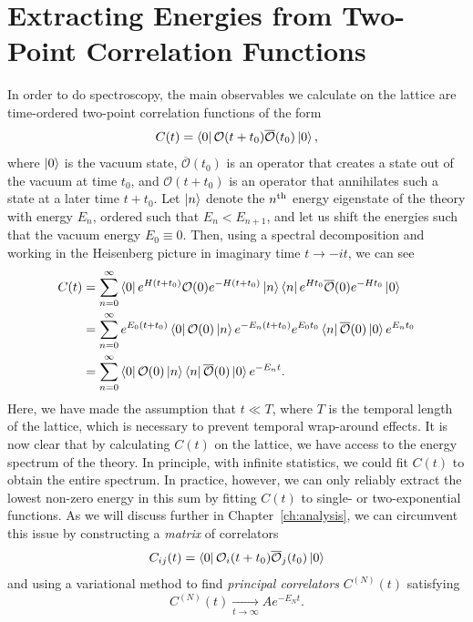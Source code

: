 \section{Extracting Energies from Two-Point Correlation Functions}\label{sec:intro_corr}
In order to do spectroscopy, the main observables we calculate on the lattice are time-ordered two-point correlation functions of the form
\begin{equation}
    C(t) = \bra 0 \mathcal O (t+t_0) \overline{\mathcal O}(t_0) \ket 0,
\end{equation}
where $\ket 0$ is the vacuum state, $\overline{\mathcal O}(t_0)$ is an operator that creates a state out of the vacuum at time $t_0$, and $\mathcal O (t+t_0)$ is an operator that annihilates such a state at a later time $t+t_0$. Let $\ket n$ denote the $n^{\rm{th}}$ energy eigenstate of the theory with energy $E_n$, ordered such that $E_n < E_{n+1}$, and let us shift the energies such that the vacuum energy $E_0 \equiv 0$. Then, using a spectral decomposition and working in the Heisenberg picture in imaginary time $t\rightarrow -it$, we can see
\begin{equation}\label{eq:corr_decomp}
    \begin{aligned}
        C(t) &= \sum_{n=0}^\infty \bra 0 e^{H(t+t_0)} \mathcal O(0) e^{-H(t+t_0)} \ket n \bra n e^{H t_0} \overline{\mathcal O}(0)e^{-H t_0} \ket 0 \\
        &=\sum_{n=0}^\infty e^{E_0(t+t_0)} \bra 0 \mathcal O(0) \ket n e^{-E_n(t+t_0)} e^{E_0 t_0} \bra n \overline{\mathcal O}(0) \ket 0 e^{E_n t_0}\\
        & = \sum_{n=0}^\infty \bra 0 \mathcal O(0) \ket n \bra n \overline{\mathcal O}(0)\ket 0 e^{-E_n t}.
    \end{aligned}
\end{equation}
Here, we have made the assumption that $t \ll T$, where $T$ is the temporal length of the lattice, which is necessary to prevent temporal wrap-around effects. It is now clear that by calculating $C(t)$ on the lattice, we have access to the energy spectrum of the theory. In principle, with infinite statistics, we could fit $C(t)$ to obtain the entire spectrum. In practice, however, we can only reliably extract the lowest non-zero energy in this sum by fitting $C(t)$ to single- or two-exponential functions. As we will discuss further in Chapter~\ref{ch:analysis}, we can circumvent this issue by constructing a \emph{matrix} of correlators
\begin{equation}
    C_{ij}(t) = \bra 0 \mathcal O_i(t+t_0) \overline{\mathcal O}_j(t_0) \ket 0
\end{equation}
and using a variational method to find \emph{principal correlators} $C^{(N)}(t)$ satisfying
\begin{equation}
    C^{(N)}(t) \xrightarrow[t\rightarrow \infty]{} A e^{-E_N t}.
\end{equation}

